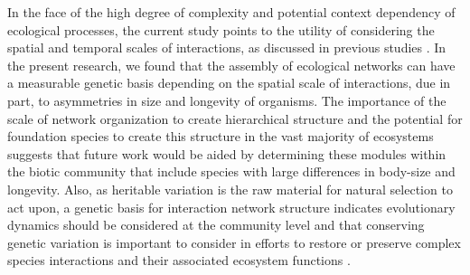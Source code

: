 \documentclass[fleqn,12pt]{olplainarticle}
\begin{document}
In the face of the high degree of complexity and potential context
dependency of ecological processes, the current study points to the
utility of considering the spatial and temporal scales of
interactions, as discussed in previous studies \citep{Bangert2006,
  Zook2010, Zytynska2012}. In the present research, we found that the
assembly of ecological networks can have a measurable genetic basis
depending on the spatial scale of interactions, due in part, to
asymmetries in size and longevity of organisms. The importance of the
scale of network organization to create hierarchical structure
\citep{Guimaraes2020TheOrganization} and the potential for foundation
species to create this structure in the vast majority of ecosystems
\citep{Ellison2005, Whitham2006a} suggests that future work would be
aided by determining these modules within the biotic community that
include species with large differences in body-size and
longevity. Also, as heritable variation is the raw material for
natural selection to act upon, a genetic basis for interaction network
structure indicates evolutionary dynamics should be considered at the
community level and that conserving genetic variation is important to
consider in efforts to restore or preserve complex species
interactions and their associated ecosystem functions
\citep{Evans2013}. 
\end{document}
